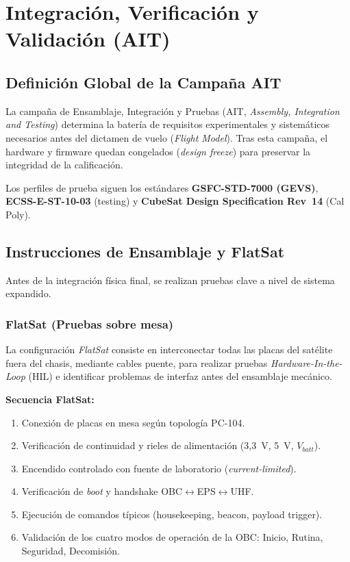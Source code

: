 \chapter{Integración, Verificación y Validación (AIT)}

\section{Definición Global de la Campaña AIT}
La campaña de Ensamblaje, Integración y Pruebas (AIT, \textit{Assembly, Integration and Testing}) determina la batería de requisitos experimentales y sistemáticos necesarios antes del dictamen de vuelo (\textit{Flight Model}). Tras esta campaña, el hardware y firmware quedan congelados (\textit{design freeze}) para preservar la integridad de la calificación.

Los perfiles de prueba siguen los estándares \textbf{GSFC-STD-7000 (GEVS)}, \textbf{ECSS-E-ST-10-03} (testing) y \textbf{CubeSat Design Specification Rev~14} (Cal Poly).

\section{Instrucciones de Ensamblaje y FlatSat}
Antes de la integración física final, se realizan pruebas clave a nivel de sistema expandido.

\subsection{FlatSat (Pruebas sobre mesa)}
La configuración \textit{FlatSat} consiste en interconectar todas las placas del satélite fuera del chasis, mediante cables puente, para realizar pruebas \textit{Hardware-In-the-Loop} (HIL) e identificar problemas de interfaz antes del ensamblaje mecánico.

\textbf{Secuencia FlatSat:}
\begin{enumerate}
    \item Conexión de placas en mesa según topología PC-104.
    \item Verificación de continuidad y rieles de alimentación (3{,}3~V, 5~V, $V_{batt}$).
    \item Encendido controlado con fuente de laboratorio (\textit{current-limited}).
    \item Verificación de \textit{boot} y handshake OBC$\leftrightarrow$EPS$\leftrightarrow$UHF.
    \item Ejecución de comandos típicos (housekeeping, beacon, payload trigger).
    \item Validación de los cuatro modos de operación de la OBC: Inicio, Rutina, Seguridad, Decomisión.
\end{enumerate}

